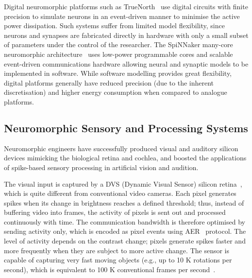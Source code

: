 Digital neuromorphic platforms such as TrueNorth~\citep{merolla2014million} use digital circuits with finite precision to simulate neurons in an event-driven manner to minimise the active power dissipation.
Such systems suffer from limited model flexibility, since neurons and synapses are fabricated directly in hardware with only a small subset of parameters under the control of the researcher.
The SpiNNaker many-core neuromorphic architecture~\citep{furber2014spinnaker} uses low-power programmable cores and scalable event-driven communications hardware allowing neural and synaptic models to be implemented in software.
While software modelling provides great flexibility, digital platforms generally have reduced precision (due to the inherent discretisation) and higher energy consumption when compared to analogue platforms.

\subsection{Neuromorphic Sensory and Processing Systems}
\label{sec:morph}
Neuromorphic engineers have successfully produced visual and auditory silicon devices mimicking the biological retina and cochlea, and boosted the applications of spike-based sensory processing in artificial vision and audition.

The visual input is captured by a DVS (Dynamic Visual Sensor) silicon retina~\citep{serrano2013128, delbruck2008frame}, which is quite different from conventional video cameras.
Each pixel generates spikes when its change in brightness reaches a defined threshold;
thus, instead of buffering video into frames, the activity of pixels is sent out and processed continuously with time.
The communication bandwidth is therefore optimised by sending activity only, which is encoded as pixel events using \DIFaddbegin {}\DIFaddend AER~\citep{lazzaro1995multi} protocol.
The level of activity depends on the contrast change; pixels generate spikes faster and more frequently when they are subject to more active change.
The sensor is capable of capturing very fast moving objects (e.g., up to 10 K rotations per second), which is equivalent to 100 K conventional frames per second~\citep{lenero20113}.
\DIFaddbegin {}\DIFaddend 

